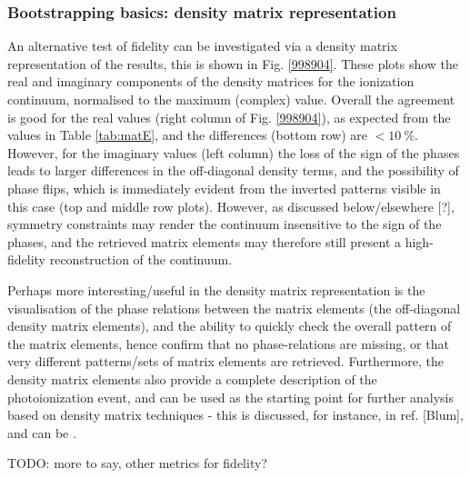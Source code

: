 \subsubsection{Bootstrapping basics: density matrix representation}

An alternative test of fidelity can be investigated via a density matrix representation of the results, this is shown in Fig. \ref{998904}. These plots show the real and imaginary components of the density matrices for the ionization continuum, normalised to the maximum (complex) value. Overall the agreement is good for the real values (right column of Fig. \ref{998904}), as expected from the values in Table \ref{tab:matE}, and the differences (bottom row) are $<10~\%$. However, for the imaginary values (left column) the loss of the sign of the phases leads to larger differences in the off-diagonal density terms, and the possibility of phase flips, which is immediately evident from the inverted patterns visible in this case (top and middle row plots). However, as discussed below/elsewhere [?], symmetry constraints may render the continuum insensitive to the sign of the phases, and the retrieved matrix elements may therefore still present a high-fidelity reconstruction of the continuum.

Perhaps more interesting/useful in the density matrix representation is the visualisation of the phase relations between the matrix elements (the off-diagonal density matrix elements), and the ability to quickly check the overall pattern of the matrix elements, hence confirm that no phase-relations are missing, or that very different patterns/sets of matrix elements are retrieved. Furthermore, the density matrix elements also provide a complete description of the photoionization event, and can be used as the starting point for further analysis based on density matrix techniques - this is discussed, for instance, in ref. [Blum], and can be .

TODO: more to say, other metrics for fidelity?
